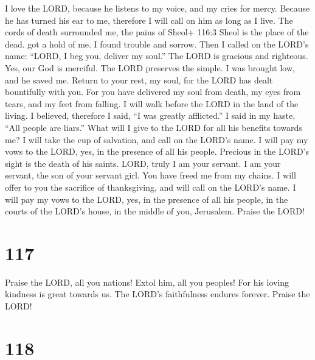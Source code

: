 I love the LORD, because he listens to my voice, and my
cries for mercy.  Because he has turned his ear to me,
therefore I will call on him as long as I live.  The cords
of death surrounded me, the pains of Sheol+ 116:3 Sheol is the place of
the dead. got a hold of me. I found trouble and sorrow. 
Then I called on the LORD's name: ``LORD, I beg you, deliver my soul.''
 The LORD is gracious and righteous. Yes, our God is
merciful.  The LORD preserves the simple. I was brought low,
and he saved me.  Return to your rest, my soul, for the LORD
has dealt bountifully with you.  For you have delivered my
soul from death, my eyes from tears, and my feet from falling.
 I will walk before the LORD in the land of the living.
 I believed, therefore I said, ``I was greatly afflicted.''
 I said in my haste, ``All people are liars.''
 What will I give to the LORD for all his benefits towards
me?  I will take the cup of salvation, and call on the
LORD's name.  I will pay my vows to the LORD, yes, in the
presence of all his people.  Precious in the LORD's sight
is the death of his saints.  LORD, truly I am your servant.
I am your servant, the son of your servant girl. You have freed me from
my chains.  I will offer to you the sacrifice of
thanksgiving, and will call on the LORD's name.  I will pay
my vows to the LORD, yes, in the presence of all his people,
 in the courts of the LORD's house, in the middle of you,
Jerusalem. Praise the LORD!

\hypertarget{section-107}{%
\section{117}\label{section-107}}

 Praise the LORD, all you nations! Extol him, all you
peoples!  For his loving kindness is great towards us. The
LORD's faithfulness endures forever. Praise the LORD!

\hypertarget{section-108}{%
\section{118}\label{section-108}}

